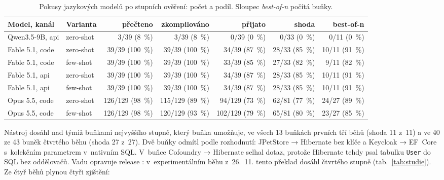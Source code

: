\begin{table}[H]
\centering\footnotesize
\setlength{\tabcolsep}{3pt}
\begin{tabular}{l l r r r r r}
\toprule
\textbf{Model, kanál} & \textbf{Varianta} & \textbf{přečteno} & \textbf{zkompilováno} & \textbf{přijato} & \textbf{shoda} & \textbf{best-of-n} \\
\midrule
Qwen3.5-9B, api & zero-shot & 3/39 (8~\%) & 3/39 (8~\%) & 0/39 (0~\%) & 0/33 (0~\%) & 0/11 (0~\%) \\
Fable 5.1, code & zero-shot & 39/39 (100~\%) & 39/39 (100~\%) & 34/39 (87~\%) & 28/33 (85~\%) & 10/11 (91~\%) \\
Fable 5.1, code & few-shot & 39/39 (100~\%) & 39/39 (100~\%) & 33/39 (85~\%) & 27/33 (82~\%) & 9/11 (82~\%) \\
Fable 5.1, api & zero-shot & 39/39 (100~\%) & 39/39 (100~\%) & 34/39 (87~\%) & 28/33 (85~\%) & 10/11 (91~\%) \\
Fable 5.1, api & few-shot & 39/39 (100~\%) & 39/39 (100~\%) & 34/39 (87~\%) & 28/33 (85~\%) & 10/11 (91~\%) \\
Opus 5.5, code & zero-shot & 126/129 (98~\%) & 115/129 (89~\%) & 94/129 (73~\%) & 62/81 (77~\%) & 24/27 (89~\%) \\
Opus 5.5, code & few-shot & 126/129 (98~\%) & 120/129 (93~\%) & 102/129 (79~\%) & 65/81 (80~\%) & 23/27 (85~\%) \\
\bottomrule
\end{tabular}
\caption{Pokusy jazykových modelů po stupních ověření: počet a podíl. Sloupec \emph{best-of-n} počítá buňky.}
\label{tab:llm-vysledky}
\end{table}

Nástroj dosáhl nad týmiž buňkami nejvyššího stupně, který buňka umožňuje, ve všech 13 buňkách prvních tří běhů (shoda 11 z~11) a ve 40 ze 43 buněk čtvrtého běhu (shoda 27 z~27). Dvě buňky odmítl podle rozhodnutí: JPetStore → Hibernate bez klíče a Keycloak → EF~Core s~kolekčním parametrem v~nativním SQL. V~buňce Cofoundry → Hibernate selhal dotaz, protože Hibernate tehdy psal tabulku \texttt{User} do SQL bez oddělovačů. Vadu opravuje release \texttt{\Vydani}: v~experimentálním běhu z~26.~11. tento překlad dosáhl čtvrtého stupně (tab.~\ref{tab:studie}). Ze čtyř běhů plynou čtyři zjištění:

